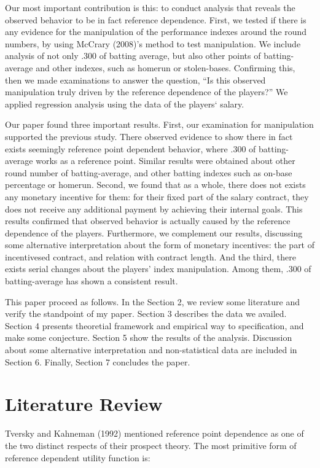 \documentclass[dvipdfmx, 12pt]{article}
\begin{document}
Our most important contribution is this: to conduct analysis that reveals the observed behavior to be in fact reference dependence. First, we tested if there is any evidence for the manipulation of the performance indexes around the round numbers, by using McCrary (2008)'s method to test manipulation. We include analysis of not only .300 of batting average, but also other points of batting-average and other indexes, such as homerun or stolen-bases. Confirming this, then we made examinations to answer the question, ``Is this observed manipulation truly driven by the reference dependence of the players?'' We applied regression analysis using the data of the players` salary.

Our paper found three important results. First, our examination for manipulation supported the previous study. There observed evidence to show there in fact exists seemingly reference point dependent behavior, where .300 of batting-average works as a reference point. Similar results were obtained about other round number of batting-average, and other batting indexes such as on-base percentage or homerun. Second, we found that as a whole, there does not exists any monetary incentive for them: for their fixed part of the salary contract, they does not receive any additional payment by achieving their internal goals. This results confirmed that observed behavior is actually caused by the reference dependence of the players. Furthermore, we complement our results, discussing some alternative interpretation about the form of monetary incentives: the part of incentivesed contract, and relation with contract length. And the third, there exists serial changes about the players' index manipulation. Among them, .300 of batting-average has shown a consistent result.

This paper proceed as follows. In the Section 2, we review some literature and verify the standpoint of my paper. Section 3 describes the data we availed. Section 4 presents theoretial framework and empirical way to specification, and make some conjecture.  Section 5 show the results of the analysis. Discussion about some alternative interpretation and non-statistical data are included in Section 6. Finally, Section 7 concludes the paper.

\section{Literature Review}

  Tversky and Kahneman (1992) mentioned reference point dependence as one of the two distinct respects of their prospect theory. The most primitive form of reference dependent utility function is:
\end{document}

